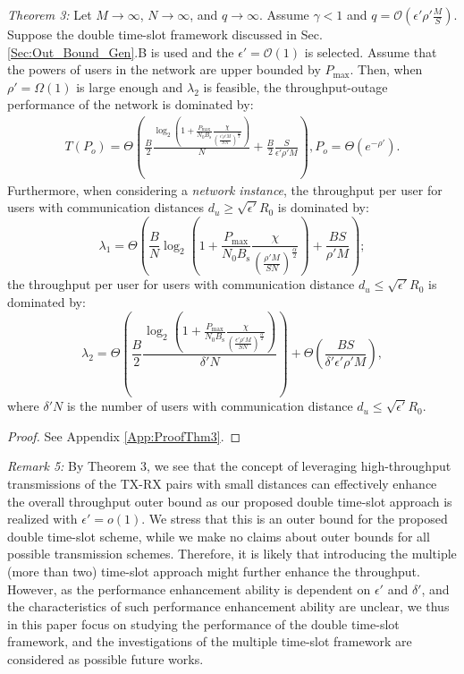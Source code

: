 \documentclass[journal,draftclsnofoot,onecolumn,12pt,twoside]{IEEEtran}
\begin{document}
{\em Theorem 3:} Let $M\to\infty$, $N\to\infty$, and $q\to\infty$. Assume $\gamma<1$ and $q=\mathcal{O}\left(\epsilon'\rho'\frac{M}{S}\right)$. Suppose the double time-slot framework discussed in Sec. \ref{Sec:Out_Bound_Gen}.B is used and the $\epsilon'=\mathcal{O}(1)$ is selected. Assume that the powers of users in the network are upper bounded by $P_{\text{max}}$. Then, when $\rho'=\Omega(1)$ is large enough and $\lambda_2$ is feasible, the throughput-outage performance of the network is dominated by:
\begin{equation}
\begin{aligned}\label{eq:g_model_TC_Anal_Final_C2}
T(P_o)=\Theta\left(\frac{B}{2}\frac{\log_2\left(1+\frac{P_{\text{max}}}{N_0B_{\text{s}}}\frac{\chi}{\left(\frac{\epsilon'\rho'M}{SN}\right)^\frac{\alpha}{2}}\right)}{N}+\frac{B}{2}\frac{S}{\epsilon'\rho'M}\right),P_o= \Theta\left(e^{-\rho'}\right).
\end{aligned}
\end{equation}
Furthermore, when considering a {\em network instance}, the throughput per user for users with communication distances $d_u\geq \sqrt{\epsilon'}R_0$ is dominated by:
\begin{equation}
\lambda_1= \Theta\left(\frac{B}{N}\log_2\left(1+\frac{P_{\text{max}}}{N_0B_{\text{s}}}\frac{\chi}{\left(\frac{\rho'M}{SN}\right)^\frac{\alpha}{2}}\right)+\frac{BS}{\rho'M}\right);
\end{equation}
the throughput per user for users with communication distance $d_u\leq\sqrt{\epsilon'}R_0$ is dominated by:
\begin{equation}
\lambda_2=\Theta\left(\frac{B}{2}\frac{\log_2\left(1+\frac{P_{\text{max}}}{N_0B_{\text{s}}}\frac{\chi}{\left(\frac{\epsilon'\rho'M}{SN}\right)^\frac{\alpha}{2}}\right)}{\delta'N}\right)+\Theta\left(\frac{BS}{\delta'\epsilon'\rho'M}\right),
\end{equation}
where $\delta'N$ is the number of users with communication distance $d_u\leq\sqrt{\epsilon'}R_0$.

\begin{proof}
See Appendix \ref{App:ProofThm3}.
\end{proof}

{\em Remark 5:} By Theorem 3, we see that the concept of leveraging high-throughput transmissions of the TX-RX pairs with small distances can effectively enhance the overall throughput outer bound as our proposed double time-slot approach is realized with $\epsilon'=o(1)$. We stress that this is an outer bound for the proposed double time-slot scheme, while we make no claims about outer bounds for all possible transmission schemes. Therefore, it is likely that introducing the multiple (more than two) time-slot approach might further enhance the throughput. However, as the performance enhancement ability is dependent on $\epsilon'$ and $\delta'$, and the characteristics of such performance enhancement ability are unclear, we thus in this paper focus on studying the performance of the double time-slot framework, and the investigations of the multiple time-slot framework are considered as possible future works.
\end{document}
